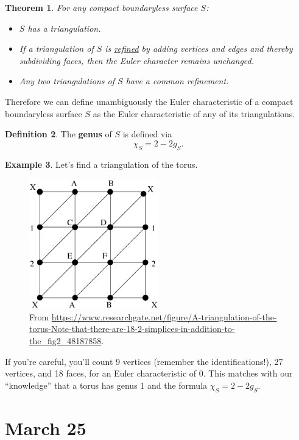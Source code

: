 \documentclass[12pt]{article}
\newtheorem{theorem}{Theorem}[section]
\theoremstyle{definition}
\newtheorem{definition}[theorem]{Definition}
\newtheorem{example}[theorem]{Example}
\theoremstyle{remark}
\begin{document}
\begin{theorem}
    For any compact boundaryless surface $S$:
    \begin{itemize}
        \item $S$ has a triangulation.
        \item If a triangulation of $S$ is \underline{refined} by adding vertices and edges and thereby subdividing faces, then the Euler character remains unchanged.
        \item Any two triangulations of $S$ have a common refinement.
    \end{itemize}
\end{theorem}
Therefore we can define unambiguously the Euler characteristic of a compact boundaryless surface $S$ as the Euler characteristic of any of its triangulations.
\begin{definition}
    The \textbf{genus} of $S$ is defined via 
    \begin{equation}
        \chi_S = 2 - 2g_S.
    \end{equation}
\end{definition}
\begin{example}
    Let's find a triangulation of the torus. 
    \begin{figure}[H]
        \centering
        \includegraphics[width = 0.5\textwidth]{16.png}
        \caption{From \url{https://www.researchgate.net/figure/A-triangulation-of-the-torus-Note-that-there-are-18-2-simplices-in-addition-to-the_fig2_48187858}.}
        \label{fig:Fig16}
    \end{figure}
    If you're careful, you'll count 9 vertices (remember the identifications!), 27 vertices, and 18 faces, for an Euler characteristic of 0. This matches with our ``knowledge'' that a torus has genus 1 and the formula $\chi_S = 2 - 2g_S$.
\end{example}
\section{March 25}
\end{document}
